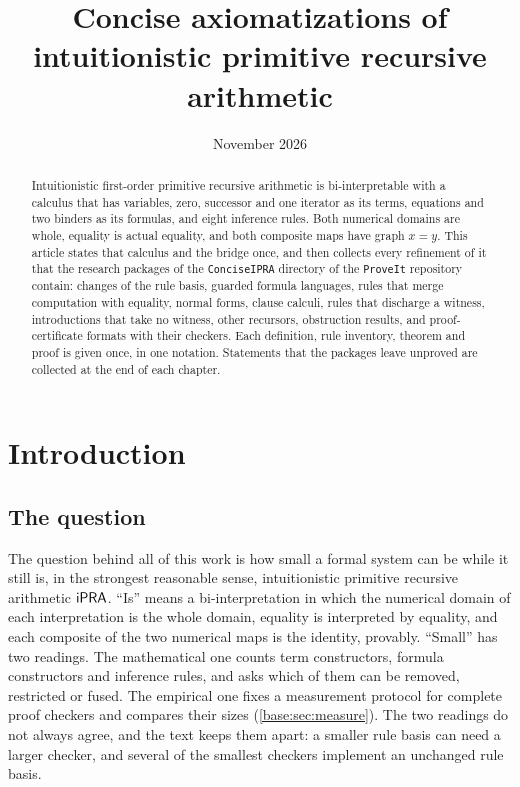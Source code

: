 
\title{Concise axiomatizations of\\ intuitionistic primitive recursive arithmetic}
\author{}
\date{November 2026}
\maketitle

\begin{abstract}
Intuitionistic first-order primitive recursive arithmetic is bi-interpretable
with a calculus that has variables, zero, successor and one iterator as its
terms, equations and two binders as its formulas, and eight inference rules.
Both numerical domains are whole, equality is actual equality, and both
composite maps have graph $x=y$. This article states that calculus and the
bridge once, and then collects every refinement of it that the research
packages of the \texttt{ConciseIPRA} directory of the \texttt{ProveIt}
repository contain: changes of the rule basis, guarded formula languages,
rules that merge computation with equality, normal forms, clause calculi,
rules that discharge a witness, introductions that take no witness, other
recursors, obstruction results, and proof-certificate formats with their
checkers. Each definition, rule inventory, theorem and proof is given once, in
one notation. Statements that the packages leave unproved are collected at the
end of each chapter.
\end{abstract}

\tableofcontents

\chapter*{Introduction}

\section*{The question}

The question behind all of this work is how small a formal system can be
while it still is, in the strongest reasonable sense, intuitionistic primitive
recursive arithmetic $\mathsf{iPRA}$. ``Is'' means a bi-interpretation in which the
numerical domain of each interpretation is the whole domain, equality is
interpreted by equality, and each composite of the two numerical maps is the
identity, provably. ``Small'' has two readings. The mathematical one counts
term constructors, formula constructors and inference rules, and asks which of
them can be removed, restricted or fused. The empirical one fixes a
measurement protocol for complete proof checkers and compares their sizes
(\cref{base:sec:measure}). The two readings do not always agree, and the text
keeps them apart: a smaller rule basis can need a larger checker, and several
of the smallest checkers implement an unchanged rule basis.

